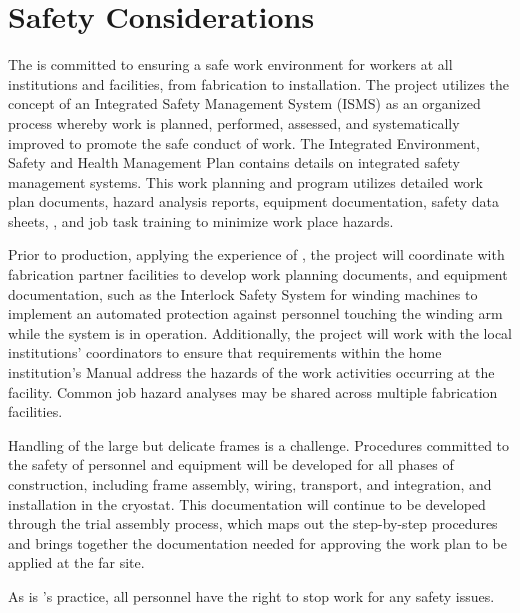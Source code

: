 \section{Safety Considerations}
\label{sec:fdsp-apa-safety}


The  is committed to ensuring a safe work environment for workers at all institutions and facilities, from  fabrication to installation. The project utilizes the concept of an Integrated Safety Management System (ISMS) as an organized process whereby work is planned, performed, assessed, and systematically improved to promote the safe conduct of work. The  Integrated Environment, Safety and Health Management Plan \cite{bib:docdb291} %
contains details on  integrated safety management systems. This work planning and  program utilizes detailed work plan documents, hazard analysis reports, equipment documentation, safety data sheets, , and job task training to minimize work place hazards. 

Prior to   production, applying the experience of , the project will coordinate with fabrication partner facilities to develop work planning documents, and equipment documentation, such as the Interlock Safety System for  winding machines to implement an automated protection against personnel touching the winding arm while the system is in operation. Additionally, the project will work with the local institutions'  coordinators to ensure that  requirements within the home institution's  Manual address the hazards of the work activities occurring at the facility. Common job hazard analyses may be shared across multiple fabrication facilities.   

Handling of the large but delicate frames is a challenge. Procedures committed to the safety of personnel and equipment will be developed for all phases of construction, including frame assembly, wiring, transport, and integration, and installation in the cryostat. This documentation will continue to be developed through the  trial assembly process, which maps out the step-by-step procedures and brings together the documentation needed for approving the work plan to be applied at the far site. 

As is 's practice, all personnel have the right to stop work for any safety issues.
